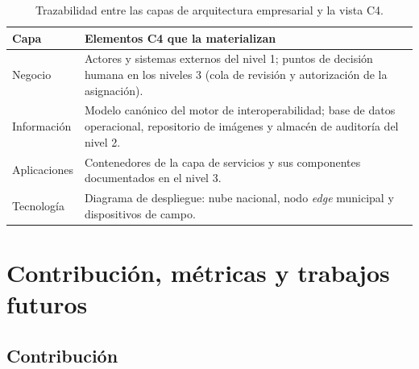 \documentclass[11pt,a4paper]{article}
\begin{document}
\begin{table}[htbp]
\centering
\caption{Trazabilidad entre las capas de arquitectura empresarial y la vista C4.}
\label{tab:c4-ae}
\begin{tabularx}{\textwidth}{@{}p{3.6cm}L@{}}
\toprule
\textbf{Capa} & \textbf{Elementos C4 que la materializan} \\
\midrule
Negocio & Actores y sistemas externos del nivel 1; puntos de decisión humana en
los niveles 3 (cola de revisión y autorización de la asignación). \\
\addlinespace
Información & Modelo canónico del motor de interoperabilidad; base de datos
operacional, repositorio de imágenes y almacén de auditoría del nivel 2. \\
\addlinespace
Aplicaciones & Contenedores de la capa de servicios y sus componentes
documentados en el nivel 3. \\
\addlinespace
Tecnología & Diagrama de despliegue: nube nacional, nodo \emph{edge} municipal y
dispositivos de campo. \\
\bottomrule
\end{tabularx}
\end{table}



\section{Contribución, métricas y trabajos futuros}

\subsection{Contribución}
\end{document}
